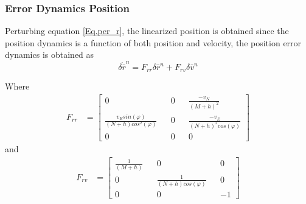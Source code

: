 \subsubsection{Error Dynamics Position}
Perturbing equation \eqref{Eq.per_r}, the linearized position is obtained since the position dynamics is a function of both position and velocity, the position error dynamics is obtained as
\begin{equation}
\delta \dot{\bar{r}}^n = F_{rr}\delta \bar{r}^n + F_{rv}\delta \bar{v}^n
\end{equation}

\noindent Where
\begin{align}
F_{rr} &=
\begin{bmatrix}
0 && 0 && \frac{-v_N}{(M+h)^2}\\
\frac{v_E sin(\varphi)}{(N+h)cos^2(\varphi)} && 0 && \frac{-v_E}{(N+h)^2cos(\varphi)} \\
0 && 0 && 0
\end{bmatrix}
\label{Eq.Frr}
\end{align}
and
\begin{align}
F_{rv} &=
\begin{bmatrix}
\frac{1}{(M+h)} && 0 && 0\\
0 && \frac{1}{(N+h)cos(\varphi)} && 0 \\
0 && 0 && -1
\end{bmatrix}
\label{Eq.Frv}
\end{align}
